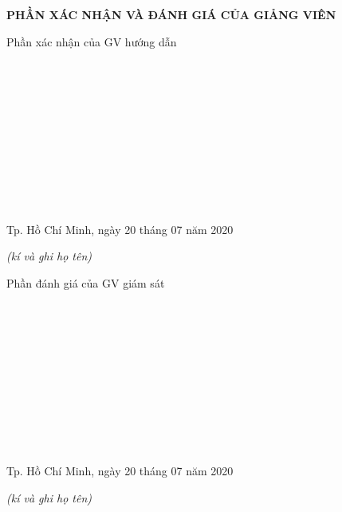 
\newpage
\changefontsizes{16pt}
\centerline{\textbf{PHẦN XÁC NHẬN VÀ ĐÁNH GIÁ CỦA GIẢNG VIÊN}}
\bigskip
\changefontsizes{13pt}
\setlength{\parindent}{2.2cm}
Phần xác nhận của GV hướng dẫn

\vspace{0.8cm}
\setlength{\parindent}{1cm}
\ \xfill{1pt} \

\bigskip
\ \xfill{1pt} \

\bigskip
\ \xfill{1pt} \

\bigskip
\ \xfill{1pt} \

\bigskip
\ \xfill{1pt} \

\bigskip
\ \xfill{1pt} \

\changefontsizes{12pt}
\setlength{\parindent}{8cm}
Tp. Hồ Chí Minh, ngày 20 tháng 07 năm 2020

\setlength{\parindent}{11cm}
\textit{(kí và ghi họ tên)}

\changefontsizes{13pt}
\vspace{2.5cm}
\setlength{\parindent}{2.2cm}
Phần đánh giá của GV giám sát

\vspace{0.8cm}
\setlength{\parindent}{1cm}
\ \xfill{1pt} \

\bigskip
\ \xfill{1pt} \

\bigskip
\ \xfill{1pt} \

\bigskip
\ \xfill{1pt} \

\bigskip
\ \xfill{1pt} \

\bigskip
\ \xfill{1pt} \

\changefontsizes{12pt}
\setlength{\parindent}{8cm}
Tp. Hồ Chí Minh, ngày 20 tháng 07 năm 2020

\setlength{\parindent}{11cm}
\textit{(kí và ghi họ tên)}
